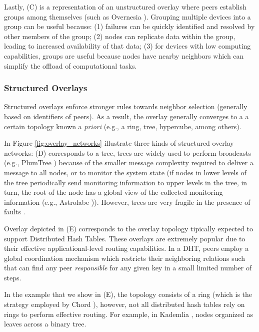 Lastly, (C) is a representation of an unstructured overlay where peers establish groups among themselves (such as Overnesia \cite{leitao2014overnesia}). Grouping multiple devices into a group can be useful because: (1) failures can be quickly identified and resolved by other members of the group; (2) nodes can replicate data within the group, leading to increased availability of that data; (3) for devices with low computing capabilities, groups are useful because nodes have nearby neighbors which can simplify the offload of computational tasks. 

\subsubsection*{Structured Overlays}

Structured overlays enforce stronger rules towards neighbor selection (generally based on identifiers of peers). As a result, the overlay generally converges to a a certain topology known a \textit{priori} (e.g., a ring, tree, hypercube, among others). 

In Figure \ref{fig:overlay_networks} illustrate three kinds of structured overlay networks: (D) corresponds to a tree, trees are widely used to perform broadcasts (e.g., PlumTree \cite{leitao2007epidemic}) because of the smaller message complexity required to deliver a message to all nodes, or to monitor the system state (if nodes in lower levels of the tree periodically send monitoring information to upper levels in the tree, in turn, the root of the node has a global view of the collected monitoring information (e.g., Astrolabe \cite{Renesse2003})). However, trees are very fragile in the presence of faults \cite{leitao2007epidemic}.

Overlay depicted in (E) corresponds to the overlay topology tipically expected to support Distributed Hash Tables. These overlays are extremely popular due to their effective applicational-level routing capabilities. In a DHT, peers employ a global coordination mechanism which restricts their neighboring relations such that can find any peer \textit{responsible} for any given key in a small limited number of steps.

In the example that we show in (E), the topology consists of a ring (which is the strategy employed by Chord \cite{stoica2003chord}), however, not all distributed hash tables rely on rings to perform effective routing. For example, in Kademlia \cite{maymounkov2002kademlia}, nodes organized as leaves across a binary tree.

